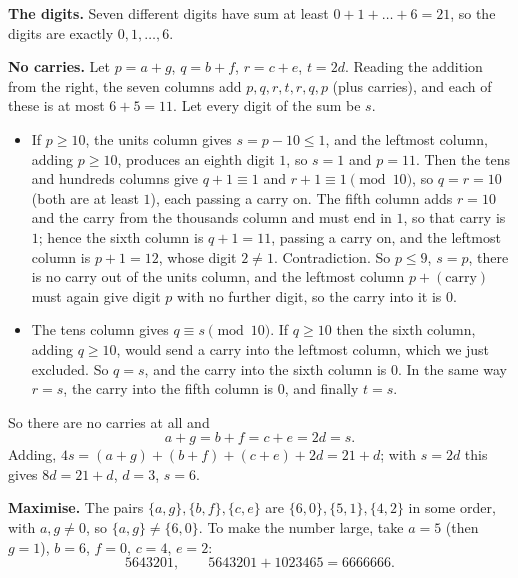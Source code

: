 \textbf{The digits.} Seven different digits have sum at least $0+1+\dots+6=21$, so the digits are exactly $0,1,\dots,6$.

\textbf{No carries.} Let $p=a+g$, $q=b+f$, $r=c+e$, $t=2d$. Reading the addition from the right, the seven columns add $p,q,r,t,r,q,p$ (plus carries), and each of these is at most $6+5=11$. Let every digit of the sum be $s$.
\begin{itemize}
\item If $p\ge10$, the units column gives $s=p-10\le1$, and the leftmost column, adding $p\ge10$, produces an eighth digit $1$, so $s=1$ and $p=11$. Then the tens and hundreds columns give $q+1\equiv1$ and $r+1\equiv1\pmod{10}$, so $q=r=10$ (both are at least $1$), each passing a carry on. The fifth column adds $r=10$ and the carry from the thousands column and must end in $1$, so that carry is $1$; hence the sixth column is $q+1=11$, passing a carry on, and the leftmost column is $p+1=12$, whose digit $2\ne1$. Contradiction. So $p\le9$, $s=p$, there is no carry out of the units column, and the leftmost column $p+(\text{carry})$ must again give digit $p$ with no further digit, so the carry into it is $0$.
\item The tens column gives $q\equiv s\pmod{10}$. If $q\ge10$ then the sixth column, adding $q\ge10$, would send a carry into the leftmost column, which we just excluded. So $q=s$, and the carry into the sixth column is $0$. In the same way $r=s$, the carry into the fifth column is $0$, and finally $t=s$.
\end{itemize}
So there are no carries at all and
\[
a+g=b+f=c+e=2d=s .
\]
Adding, $4s=(a+g)+(b+f)+(c+e)+2d=21+d$; with $s=2d$ this gives $8d=21+d$, $d=3$, $s=6$.

\textbf{Maximise.} The pairs $\{a,g\},\{b,f\},\{c,e\}$ are $\{6,0\},\{5,1\},\{4,2\}$ in some order, with $a,g\ne0$, so $\{a,g\}\ne\{6,0\}$. To make the number large, take $a=5$ (then $g=1$), $b=6$, $f=0$, $c=4$, $e=2$:
\[
\boxed{5643201},\qquad 5643201+1023465=6666666 .
\]
